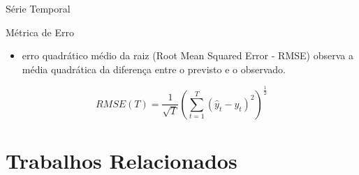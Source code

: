 \documentclass[aspectratio=169]{beamer}
\begin{document}
\begin{frame}{Série Temporal}
\begin{block}{Métrica de Erro}
    \begin{itemize}
        \item erro quadrático médio da raiz (Root Mean Squared Error - RMSE) observa a média quadrática da diferença entre o previsto e o observado.
        \end{itemize}
    
\end{block}
\begin{equation}
RMSE(T) = \frac{1}{\sqrt{T}} (\sum_{t=1}^{T} (\hat{y}_t - y_t)^2)^\frac{1}{2}    
\end{equation}
\end{frame}

\section{Trabalhos Relacionados}
\end{document}
